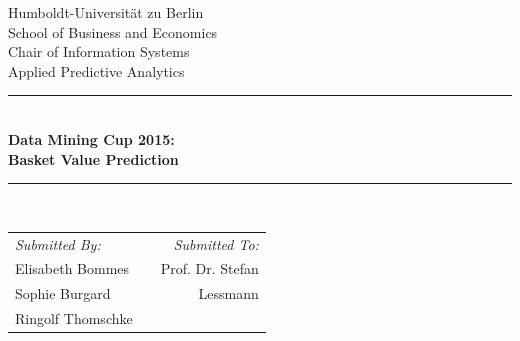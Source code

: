\documentclass[12pt]{article}
\begin{document}


\begin{titlepage}

\newcommand{\HRule}{\rule{\linewidth}{0.5mm}} %

\center %
 

\LARGE Humboldt-Universit{\"a}t zu Berlin \\[0.3cm] %
\LARGE School of Business and Economics  \\[0.3cm]
\LARGE Chair of Information Systems  \\[0.3cm]
\Large Applied Predictive Analytics\\[0.5cm] %


\HRule \\[0.4cm]
{ \huge \bfseries Data Mining Cup 2015:\\[0.5cm] Basket Value Prediction}\\[0.03cm] %
\HRule \\[1.5cm]

 


\begin{table}[H]
\begin{center}
\begin{tabular}{lcr}
\emph{Submitted By:} & & \emph{Submitted To:} \\
Elisabeth Bommes & & Prof. Dr. Stefan\\
Sophie Burgard &  & Lessmann\\
Ringolf Thomschke\\ %
\end{tabular}
\end{center}
\end{table}



\end{titlepage}
\end{document}
